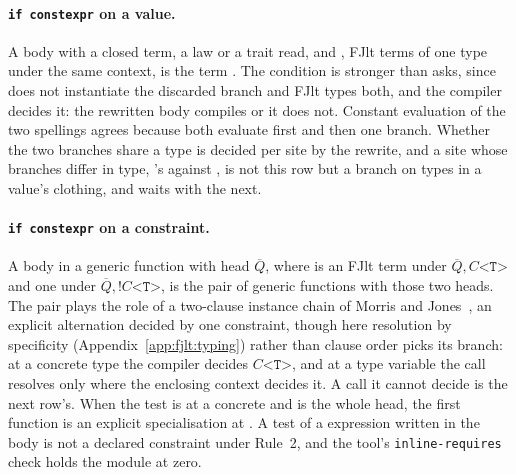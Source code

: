 \paragraph{\texttt{if constexpr} on a value.}
A body  with  a closed  term, a law or a trait read, and ,  FJlt terms of one type under the same context, is the term .
The condition is stronger than \Cpp{} asks, since \Cpp{} does not instantiate the discarded branch and FJlt types both, and the compiler decides it: the rewritten body compiles or it does not.
Constant evaluation of the two spellings agrees because both evaluate  first and then one branch.
Whether the two branches share a type is decided per site by the rewrite, and a site whose branches differ in type, 's  against , is not this row but a branch on types in a value's clothing, and waits with the next.

\paragraph{\texttt{if constexpr} on a constraint.}
A body  in a generic function with head $\overline{Q}$, where  is an FJlt term under $\overline{Q}, C\texttt{<T>}$ and  one under $\overline{Q}, \texttt{!}C\texttt{<T>}$, is the pair of generic functions with those two heads.
The pair plays the role of a two-clause instance chain of Morris and Jones~\cite{morris2010instance}, an explicit alternation decided by one constraint, though here resolution by specificity (Appendix~\ref{app:fjlt:typing}) rather than clause order picks its branch: at a concrete type the compiler decides $C\texttt{<T>}$, and at a type variable the call resolves only where the enclosing context decides it.
A call it cannot decide is the next row's.
When the test is  at a concrete  and  is the whole head, the first function is an explicit specialisation at .
A test of a  expression written in the body is not a declared constraint under Rule~2, and the tool's \texttt{inline-requires} check holds the module at zero.

